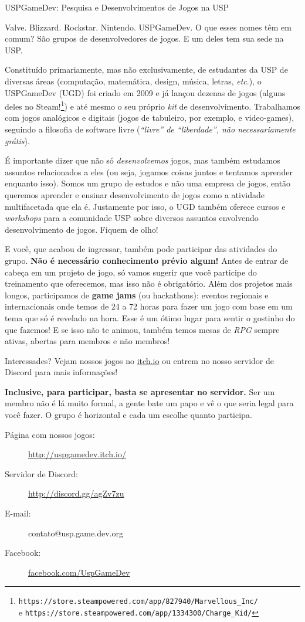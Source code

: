 \begin{subsecao}{USPGameDev: Pesquisa e Desenvolvimentos de Jogos na USP}


Valve. Blizzard. Rockstar. Nintendo. USPGameDev. O que esses nomes têm em
comum? São grupos de desenvolvedores de jogos. E um deles tem sua sede na USP.

Constituído primariamente, mas não exclusivamente, de estudantes da USP de
diversas áreas (computação, matemática, design, música, letras, \textit{etc}.),
o USPGameDev (UGD) foi criado em 2009 e já lançou dezenas de jogos (alguns
deles no Steam!\footnote{\texttt{https://store.steampowered.com/app/827940/Marvellous\_Inc/}
\\ e \texttt{https://store.steampowered.com/app/1334300/Charge\_Kid/}}) e até
mesmo o seu próprio \textit{kit} de desenvolvimento. Trabalhamos com jogos
analógicos e digitais (jogos de tabuleiro, por exemplo, e video-games),
seguindo a filosofia de software livre (\textit{``livre'' de ``liberdade'',
não necessariamente grátis}).

É importante dizer que não só \textit{desenvolvemos} jogos, mas também
estudamos assuntos relacionados a eles (ou seja, jogamos coisas juntos e
tentamos aprender enquanto isso). Somos um grupo de estudos e não uma empresa
de jogos, então queremos aprender e ensinar desenvolvimento de jogos como a
atividade multifacetada que ela é. Justamente por isso, o UGD também oferece
cursos e \textit{workshops} para a comunidade USP sobre diversos assuntos
envolvendo desenvolvimento de jogos. Fiquem de olho!

E você, que acabou de ingressar, também pode participar das atividades do grupo.
\textbf{Não é necessário conhecimento prévio algum!} Antes de entrar de cabeça
em um projeto de jogo, só vamos sugerir que você participe do treinamento que
oferecemos, mas isso não é obrigatório. Além dos projetos mais longos,
participamos de \textbf{game jams} (ou hackathons): eventos regionais e
internacionais onde temos de 24 a 72 horas para fazer um jogo com base em um
tema que só é revelado na hora. Esse é um ótimo lugar para sentir o gostinho
do que fazemos! E se isso não te animou, também temos mesas de \textit{RPG}
sempre ativas, abertas para membros e não membros!

Interessades? Vejam nossos jogos no \url{itch.io} ou entrem no nosso servidor
de Discord para mais informações!

\textbf{Inclusive, para participar, basta se apresentar no servidor.} 
Ser um membro não é lá muito formal, a gente bate um papo e vê 
o que seria legal para você fazer. O grupo é horizontal e cada 
um escolhe quanto participa.

\begin{description}
  \item[Página com nossos jogos:] \url{http://uspgamedev.itch.io/}
  \item[Servidor de Discord:] \url{http://discord.gg/agZv7zu}
  \item[E-mail:] contato@usp.game.dev.org
  \item[Facebook:] \url{facebook.com/UspGameDev}
\end{description}

\end{subsecao}
